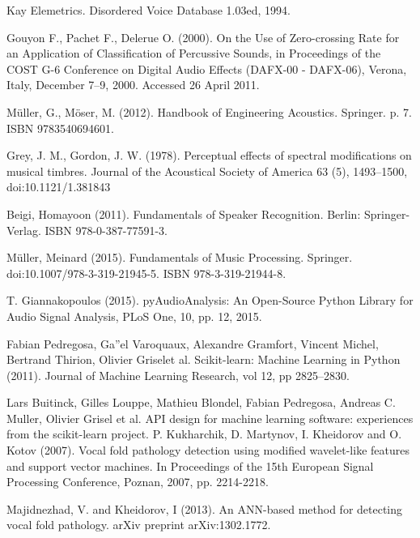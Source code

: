 \documentclass[conference]{IEEEtran}
\begin{document}
\begin{thebibliography}{00}
Kay Elemetrics. Disordered Voice Database 1.03ed, 1994.	

 Gouyon F., Pachet F., Delerue O. (2000). On the Use of Zero-crossing Rate for an Application of Classification of Percussive Sounds, in Proceedings of the COST G-6 Conference on Digital Audio Effects (DAFX-00 - DAFX-06), Verona, Italy, December 7–9, 2000. Accessed 26 April 2011.

Müller, G., Möser, M. (2012). Handbook of Engineering Acoustics. Springer. p. 7. ISBN 9783540694601.

Grey, J. M., Gordon, J. W. (1978). Perceptual effects of spectral modifications on musical timbres. Journal of the Acoustical Society of America 63 (5), 1493–1500, doi:10.1121/1.381843

Beigi, Homayoon (2011). Fundamentals of Speaker Recognition. Berlin: Springer-Verlag. ISBN 978-0-387-77591-3.

Müller, Meinard (2015). Fundamentals of Music Processing. Springer. doi:10.1007/978-3-319-21945-5. ISBN 978-3-319-21944-8.

T. Giannakopoulos (2015). pyAudioAnalysis: An Open-Source Python Library for Audio Signal Analysis, PLoS One, 10, pp. 12, 2015.

Fabian Pedregosa, Ga''el Varoquaux, Alexandre Gramfort, Vincent Michel, Bertrand Thirion, Olivier Griselet al. Scikit-learn: Machine Learning in Python (2011). Journal of Machine Learning Research, vol 12, pp 2825--2830.

Lars Buitinck, Gilles Louppe, Mathieu Blondel, Fabian Pedregosa, Andreas C. Muller, Olivier Grisel et al. API design for machine learning software: experiences from the scikit-learn project.
P. Kukharchik, D. Martynov, I. Kheidorov and O. Kotov (2007). Vocal fold pathology detection using modified wavelet-like features and support vector machines. In Proceedings of the 15th European Signal Processing Conference, Poznan, 2007, pp. 2214-2218.

Majidnezhad, V. and Kheidorov, I (2013). An ANN-based method for detecting vocal fold pathology. arXiv preprint arXiv:1302.1772.


\end{thebibliography}
\end{document}
